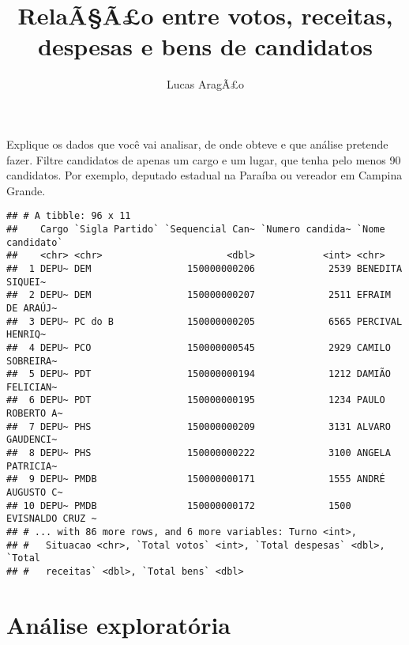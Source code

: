 \documentclass[]{article}
\title{RelaÃ§Ã£o entre votos, receitas, despesas e bens de candidatos}
\author{Lucas AragÃ£o}
\date{}
\newenvironment{Shaded}{\begin{snugshade}}{\end{snugshade}}
\newcommand{\KeywordTok}[1]{\textcolor[rgb]{0.13,0.29,0.53}{\textbf{#1}}}
\newcommand{\StringTok}[1]{\textcolor[rgb]{0.31,0.60,0.02}{#1}}
\newcommand{\CommentTok}[1]{\textcolor[rgb]{0.56,0.35,0.01}{\textit{#1}}}
\newcommand{\OperatorTok}[1]{\textcolor[rgb]{0.81,0.36,0.00}{\textbf{#1}}}
\newcommand{\NormalTok}[1]{#1}
\begin{document}
\maketitle

Explique os dados que você vai analisar, de onde obteve e que análise
pretende fazer. Filtre candidatos de apenas um cargo e um lugar, que
tenha pelo menos 90 candidatos. Por exemplo, deputado estadual na
Paraíba ou vereador em Campina Grande.

\begin{Shaded}
\end{Shaded}

\begin{verbatim}
## # A tibble: 96 x 11
##    Cargo `Sigla Partido` `Sequencial Can~ `Numero candida~ `Nome candidato`
##    <chr> <chr>                      <dbl>            <int> <chr>           
##  1 DEPU~ DEM                 150000000206             2539 BENEDITA SIQUEI~
##  2 DEPU~ DEM                 150000000207             2511 EFRAIM DE ARAÚJ~
##  3 DEPU~ PC do B             150000000205             6565 PERCIVAL HENRIQ~
##  4 DEPU~ PCO                 150000000545             2929 CAMILO SOBREIRA~
##  5 DEPU~ PDT                 150000000194             1212 DAMIÃO FELICIAN~
##  6 DEPU~ PDT                 150000000195             1234 PAULO ROBERTO A~
##  7 DEPU~ PHS                 150000000209             3131 ALVARO GAUDENCI~
##  8 DEPU~ PHS                 150000000222             3100 ANGELA PATRICIA~
##  9 DEPU~ PMDB                150000000171             1555 ANDRÉ AUGUSTO C~
## 10 DEPU~ PMDB                150000000172             1500 EVISNALDO CRUZ ~
## # ... with 86 more rows, and 6 more variables: Turno <int>,
## #   Situacao <chr>, `Total votos` <int>, `Total despesas` <dbl>, `Total
## #   receitas` <dbl>, `Total bens` <dbl>
\end{verbatim}

\section{Análise exploratória}\label{analise-exploratoria}
\end{document}
